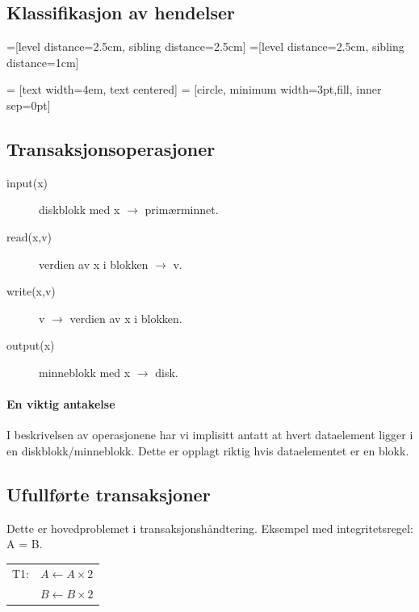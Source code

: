 \documentclass[12pt,a4paper]{article}
\newcommand{\inttt}{integritetsregel}
\begin{document}
\subsection{Klassifikasjon av hendelser}

=[level distance=2.5cm, sibling distance=2.5cm]
=[level distance=2.5cm, sibling distance=1cm]

 = [text width=4em, text centered]
 = [circle, minimum width=3pt,fill, inner sep=0pt]


\subsection{Transaksjonsoperasjoner}
\begin{description}
\item[input(x)] diskblokk med x $\rightarrow$ primærminnet.
\item[read(x,v)] verdien av x i blokken $\rightarrow$ v.
\item[write(x,v)] v $\rightarrow$ verdien av x i blokken.
\item[output(x)] minneblokk med x $\rightarrow$ disk.
\end{description}

\paragraph{En viktig antakelse} I beskrivelsen av operasjonene har vi implisitt antatt at hvert dataelement ligger i en diskblokk/minneblokk. Dette er opplagt riktig hvis dataelementet er en blokk.

\subsection{Ufullførte transaksjoner}
Dette er hovedproblemet i transaksjonshåndtering. Eksempel med \inttt: A = B.
\begin{center}
\begin{tabular}{ll}
T1: & $A \leftarrow A \times 2$\\
& $B \leftarrow B \times 2$\\
\end{tabular}
\end{center}
\end{document}
